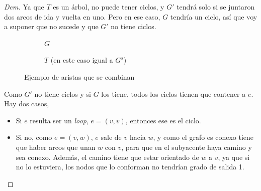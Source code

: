 \documentclass[12pt, a4paper]{report}
\theoremstyle{definition} %
\begin{document}
\begin{enumerate}[a)]
\begin{proof}[Dem]
    Ya que $T$ es un árbol, no puede tener ciclos, y $G'$ tendrá solo si se juntaron dos arcos de ida y vuelta en uno. Pero en ese caso, $G$ tendría un ciclo, así que voy a suponer que no sucede y que $G'$ no tiene ciclos.

    \begin{figure}[H]
        \centering
        \begin{subfigure}{0.4\textwidth}
            \centering
            \caption*{$G$}
        \end{subfigure}
        \begin{subfigure}{0.4\textwidth}
            \centering
            \caption*{$T$ (en este caso igual a $G^s$)}
        \end{subfigure}
        \caption*{Ejemplo de aristas que se combinan}
    \end{figure}

    Como $G'$ no tiene ciclos y si $G$ los tiene, todos los ciclos tienen que contener a $e$. Hay dos casos,

    \begin{itemize}
        \item Si $e$ resulta ser un \textit{loop}, $e = (v, v)$, entonces ese es el ciclo.
        \item Si no, como $e = (v, w)$, $e$ sale de $v$ hacia $w$, y como el grafo es conexo tiene que haber arcos que unan $w$ con $v$, para que en el subyacente haya camino y sea conexo. Además, el camino tiene que estar orientado de $w$ a $v$, ya que si no lo estuviera, los nodos que lo conforman no tendrían grado de salida 1.


\end{itemize}
\end{proof}
\end{enumerate}
\end{document}
